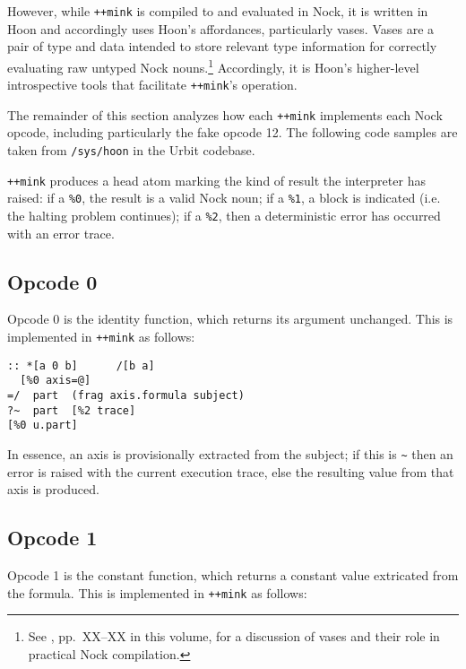 \documentclass[twoside]{article}
\begin{document}
However, while \lstinline[style=inlinecode]{++mink} is compiled to and evaluated in Nock, it is written in Hoon and accordingly uses Hoon's affordances, particularly vases.  Vases are a pair of type and data intended to store relevant type information for correctly evaluating raw untyped Nock nouns.\footnote{See \citet{Davis2025}, pp.~XX–XX in this volume, for a discussion of vases and their role in practical Nock compilation.}  Accordingly, it is Hoon's higher-level introspective tools that facilitate \lstinline[style=inlinecode]{++mink}'s operation.

The remainder of this section analyzes how each \lstinline[style=inlinecode]{++mink} implements each Nock opcode, including particularly the fake opcode 12.  The following code samples are taken from \lstinline[style=inlinecode]{/sys/hoon} in the Urbit codebase.

\lstinline[style=inlinecode]{++mink} produces a head atom marking the kind of result the interpreter has raised:  if a \lstinline[style=inlinecode]{%0}, the result is a valid Nock noun; if a \lstinline[style=inlinecode]{%1}, a block is indicated (i.e. the halting problem continues); if a \lstinline[style=inlinecode]{%2}, then a deterministic error has occurred with an error trace.

\subsection{Opcode 0}

Opcode 0 is the identity function, which returns its argument unchanged.  This is implemented in \lstinline[style=inlinecode]{++mink} as follows:

\begin{lstlisting}[style=listingcode]
:: *[a 0 b]      /[b a]
  [%0 axis=@]
=/  part  (frag axis.formula subject)
?~  part  [%2 trace]
[%0 u.part]
\end{lstlisting}

\noindent
In essence, an axis is provisionally extracted from the subject; if this is \texttt{\textasciitilde} then an error is raised with the current execution trace, else the resulting value from that axis is produced.

\subsection{Opcode 1}

Opcode 1 is the constant function, which returns a constant value extricated from the formula.  This is implemented in \lstinline[style=inlinecode]{++mink} as follows:
\end{document}
